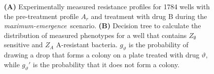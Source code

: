     \clearpage
    \begin{figure}[p]
        \hfill
        \caption{
        \textbf{(A)}
        Experimentally measured resistance profiles for 1784 wells with the pre-treatment profile \( A_r \) and treatment with drug B during the \textit{maximum-emergence}~scenario.
        \textbf{(B)}
        Decision tree to calculate the distribution of measured phenotypes for a well that contains \( Z_\emptyset \) sensitive and \( Z_A \) A-resistant bacteria.
        $g_\vartheta$ is the probability of drawing a drop that forms a colony on a plate treated with drug $\vartheta$, while $g_\vartheta'$ is the probability that it does not form a colony. 
        }
    \end{figure}



